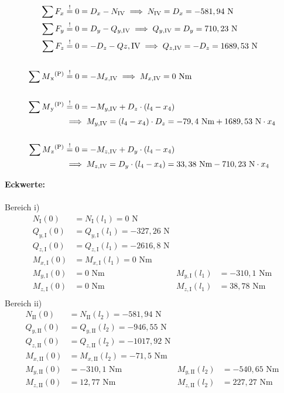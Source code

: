\begin{enumerate}
\begin{center}
\end{center}
\begin{align*}
	\sum F_x &\overset{!}{=} 0 = D_x - N_{\mathrm{IV}} 
		\implies  N_{\mathrm{IV}} = D_x = -581,94 \text { N}\\ 
	\sum F_y &\overset{!}{=} 0 =D_y - Q_{y,\mathrm{IV}}
		\implies Q_{y,\mathrm{IV}} = D_y = 710,23 \text{ N}\\ 
	\sum F_z &\overset{!}{=} 0 = -D_z -Q{z,\mathrm{IV}} 
		\implies Q_{z,\mathrm{IV}} = -D_z = 1689,53 \text{ N} \\ \\
	\sum M\textsubscript{x}\textsuperscript{(P)} &\overset{!}{=} 0 =- M_{x,\mathrm{IV}}  
		\implies M_{x,\mathrm{IV}} = 0 \text{ Nm} \\ \\
	\sum M\textsubscript{y}\textsuperscript{(P)} &\overset{!}{=} 0 =- M_{y,\mathrm{IV}} + D_z \cdot  (l_4 - x_4) \\
		&\implies M_{y,\mathrm{IV}} =  (l_4 - x_4) \cdot D_z =-79,4\text{ Nm} +1689,53 \text{ N} \cdot x_4\\ \\
	\sum M\textsubscript{z}\textsuperscript{(P)} &\overset{!}{=} 0 = - M_{z,\mathrm{IV}} + D_y \cdot  (l_4 - x_4)  \\
		&\implies  M_{z,\mathrm{IV}} =  D_y \cdot (l_4 - x_4) = 33,38\text{ Nm} -710,23 \text{ N} \cdot x_4
	\end{align*}
\end{enumerate}
\newpage
\textbf{Eckwerte:}\\ \\
Bereich i)
\begin{align*}
	N_{\mathrm{I}} (0) &= N_{\mathrm{I}} (l_1) = 0 \text{ N}\\
	Q_{y,\mathrm{I}} (0) &= Q_{y,\mathrm{I}} (l_1) = -327,26\text{ N}\\
	Q_{z,\mathrm{I}} (0) &= Q_{z,\mathrm{I}} (l_1) = -2616,8\text{ N}\\
	M_{x,\mathrm{I}} (0) &=  M_{x,\mathrm{I}} (l_1) = 0\text{ Nm}\\
	M_{y,\mathrm{I}} (0) &=  0\text{ Nm} & M_{y,\mathrm{I}} (l_1) &= -310,1\text{ Nm}\\
	M_{z,\mathrm{I}} (0) &= 0\text{ Nm} & M_{z,\mathrm{I}} (l_1) &= 38,78\text{ Nm}\\
\end{align*}
Bereich ii)
\begin{align*}
	N_{\mathrm{II}} (0) &= N_{\mathrm{II}} (l_2) = -581,94 \text{ N}\\
	Q_{y,\mathrm{II}} (0) &= Q_{y,\mathrm{II}} (l_2) =-946,55\text{ N}\\
	Q_{z,\mathrm{II}} (0) &= Q_{z,\mathrm{II}} (l_2) = -1017,92\text{ N}\\
	M_{x,\mathrm{II}} (0) &= M_{x,\mathrm{II}} (l_2) = -71,5\text{ Nm}\\
	M_{y,\mathrm{II}} (0) &=  -310,1 \text{ Nm} & M_{y,\mathrm{II}} (l_2) &= -540,65\text{ Nm}\\
	M_{z,\mathrm{II}} (0) &=  12,77\text{ Nm} &M_{z,\mathrm{II}} (l_2) &= 227,27\text{ Nm}\\
\end{align*}
